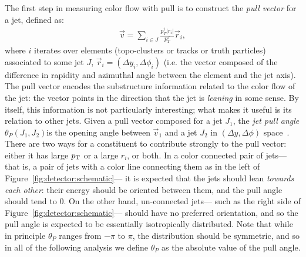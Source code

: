 The first step in measuring color flow with pull is to construct the \textit{pull vector} for a jet, defined as:
%
\begin{align}
\label{eqn:pull}
\vec{v} = \sum_{i\in J} \frac{p_T^i |r_i|}{p_T^{J}}\vec{r}_i,
\end{align}
%
where $i$ iterates over elements (topo-clusters or tracks or truth particles) associated to some jet $J$, $\vec{r}_i = (\Delta y_i,\Delta\phi_i)$ (i.e. the vector composed of the difference in rapidity and azimuthal angle between the element and the jet axis). The pull vector encodes the substructure information related to the color flow of the jet: the vector points in the direction that the jet is \textit{leaning} in some sense. By itself, this information is not particularly interesting; what makes it useful is its relation to other jets. Given a pull vector composed for a jet $J_1$, the \textit{jet pull angle} $\theta_P(J_1, J_2)$is the opening angle between $\vec{v}_1$ and a jet $J_2$ in $(\Delta y,\Delta\phi)$ space~\cite{Gallicchio:2010sw}. There are two ways for a constituent to contribute strongly to the pull vector: either it has large $p_{\text{T}}$ or a large $r_i$, or both. In a color connected pair of jets--- that is, a pair of jets with a color line connecting them as in the left of Figure~\ref{fig:detector:schematic}--- it is expected that the jets should lean \textit{towards each other}: their energy should be oriented between them, and the pull angle should tend to 0. On the other hand, un-connected jets--- such as the right side of Figure~\ref{fig:detector:schematic}--- should have no preferred orientation, and so the pull angle is expected to be essentially isotropically distributed. Note that while in principle $\theta_P$ ranges from $-\pi$ to $\pi$, the distribution should  be symmetric, and so in all of the following analysis we define $\theta_P$ as the absolute value of the pull angle.





